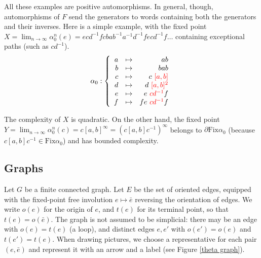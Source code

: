 \documentclass[11pt]{amsart}
\theoremstyle{remark}
\newcommand{\m} {^{-1}}
\newcommand{\Fix}{{\mathrm{Fix}}}
\newcommand{\bo}{\partial}
\begin{document}
All these examples are positive automorphisms. In general, though, automorphisms of $F$ send the generators to words containing both the generators and their inverses. Here is a simple  example, with the fixed point $X=\lim_{n\to\infty}\alpha_0^n(e)=ecd\m fcbab\m a\m d\m fecd\m f\dots$ containing  exceptional paths (such as $cd\m$). 
$$\alpha_0:{\left\{\begin{array}{rrr} a&\mapsto &{ab}\\ 
b&\mapsto &{bab}\\ 
c&\mapsto &{c\ {\color{red}[a,b]}}\\ 
d&\mapsto& {d\ {\color{red}[a,b]^2}}\\
e&\mapsto& {e\ {\color{red}cd\m} f}\\ 
f&\mapsto& {fe\ {\color{red}cd\m} f}\\ 
    \end{array}\right.}$$
    
The complexity of $X$ is quadratic. On the other hand, the fixed point $Y=\lim_{n\to\infty}\alpha_0^n(c)=c[a,b]^\infty=(c[a,b]c\m)^\infty$ belongs to $\bo\Fix\alpha_0$ (because $c[a,b]c\m\in\Fix\alpha_0$) and has bounded complexity.


 
 \subsection{Graphs}\label{gra}
 Let $G$ be a finite connected graph. 
  Let $E$ be the set of oriented edges, equipped with the fixed-point free involution $e\mapsto \bar e$ reversing the orientation of edges. We write $o(e)$ for the origin of $e$, and $t(e)$ for its terminal point, so that $t(e)=o(\bar e)$. The graph is not assumed to be simplicial: there may be an edge with $o(e)=t(e)$ (a loop), and distinct edges $e,e'$ with $o(e')=o(e)$ and $t(e')=t(e)$. When drawing pictures, we choose a representative for each pair $(e,\bar e)$ and represent it with an arrow and a label (see Figure \ref{theta graph}).
 
\end{document}
